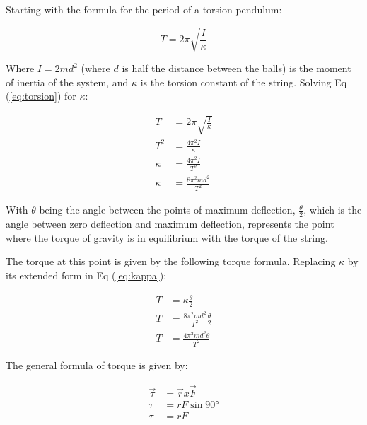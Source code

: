 \documentclass[12pt]{article}
\begin{document}
    Starting with the formula for the period of a torsion pendulum:

    \begin{equation}
        T=2\pi\sqrt{\frac{I}{\kappa}} \label{eq:torsion}
    \end{equation}

    Where $I = 2md^2$ (where $d$ is half the distance between the balls) is the moment of inertia of the system, and $\kappa$ is the torsion constant of the string. Solving Eq (\ref{eq:torsion}) for $\kappa$:

    \begin{equation}
        \begin{aligned}
            T&=2\pi\sqrt{\frac{I}{\kappa}}\\ 
            T^2&=\frac{4\pi^2I}{\kappa}\\ 
            \kappa&=\frac{4\pi^2I}{T^2}\\ 
            \kappa&=\frac{8\pi^2md^2}{T^2} \label{eq:kappa} 
        \end{aligned}
    \end{equation}

    With $\theta$ being the angle between the points of maximum deflection, $\frac{\theta}{2}$, which is the angle between zero deflection and maximum deflection, represents the point where the torque of gravity is in equilibrium with the torque of the string. 

    The torque at this point is given by the following torque formula. Replacing $\kappa$ by its extended form in Eq (\ref{eq:kappa}):

    \begin{align}
        T&=\kappa\frac{\theta}{2}\nonumber\\ 
        T&=\frac{8\pi^2md^2}{T^2}  \frac{\theta}{2} \nonumber\\
        T&=\frac{4\pi^2md^2\theta}{T^2} \label{eq:torque}
    \end{align}

    The general formula of torque is given by:

    \begin{equation}
        \begin{aligned}
            \vec{\tau}&= \vec{r} x \vec{F}\\
            \tau&=rF \sin{\ang{90}}\\
            \tau&=rF
        \end{aligned}
    \end{equation}
\end{document}
